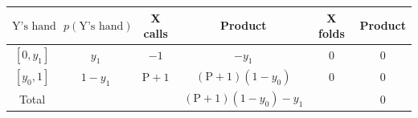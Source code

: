 \documentclass[border=3pt]{standalone}
\begin{document}
{\Large
\renewcommand{\arraystretch}{1.3}
\begin{tabular}{|c|c|c|c|c|c|}
\hline
    $\mathrm{Y}\text{'s hand}$ &
    $p(\mathrm{Y}\text{'s hand})$ &
    X calls &
    Product &
    X folds &
    Product \\
\hline
    $[0, y_1]$ & $y_1$ & $-1$ & $-y_1$ & $0$ & $0$ \\
\hline
    $[y_0, 1]$ & $1 - y_1$ & $\mathrm{P}+1$ &
    $(\mathrm{P}+1)(1 - y_0)$ & $0$ & $0$ \\
\hline
    Total & & & $(\mathrm{P}+1)(1 - y_0) - y_1$ & & $0$ \\
\hline
\end{tabular}
}
\end{document}
